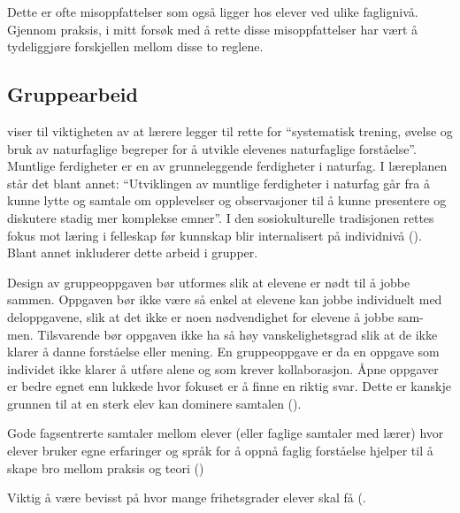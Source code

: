 \documentclass[main.tex]{subfiles}
\begin{document}
Dette er ofte misoppfattelser som også ligger hos elever ved ulike faglignivå. Gjennom praksis, i mitt forsøk med å 
rette disse misoppfattelser har vært å tydeliggjøre forskjellen mellom disse to reglene. 


\subsection*{Gruppearbeid}

 viser til viktigheten av at lærere
legger til rette for ``systematisk trening, øvelse og bruk av naturfaglige begreper for å utvikle
elevenes naturfaglige forståelse''. Muntlige ferdigheter er en av grunneleggende ferdigheter i naturfag. 
I læreplanen står det blant annet: ``Utviklingen av muntlige ferdigheter i naturfag går
fra å kunne lytte og samtale om opplevelser og observasjoner til å kunne presentere og diskutere 
stadig mer komplekse emner''. I den sosiokulturelle tradisjonen rettes fokus mot læring i
felleskap før kunnskap blir internalisert på individnivå (). Blant annet inkluderer 
dette arbeid i grupper.

Design av gruppeoppgaven bør utformes slik at
elevene er nødt til å jobbe sammen. Oppgaven bør ikke være så enkel at elevene kan jobbe
individuelt med deloppgavene, slik at det ikke er noen nødvendighet for elevene å jobbe sam-
men. Tilsvarende bør oppgaven ikke ha så høy vanskelighetsgrad slik at de ikke klarer å danne
forståelse eller mening. En gruppeoppgave er da en oppgave som individet ikke klarer å utføre
alene og som krever kollaborasjon. Åpne oppgaver er bedre egnet enn lukkede hvor fokuset er
å finne en riktig svar. Dette er kanskje grunnen til at en sterk elev kan dominere samtalen 
().

Gode fagsentrerte samtaler mellom elever (eller faglige samtaler med lærer) hvor elever bruker egne erfaringer og språk for å oppnå faglig forståelse hjelper til å skape bro mellom praksis og teori ()

Viktig å være bevisst på hvor mange frihetsgrader elever skal få (.
\end{document}
